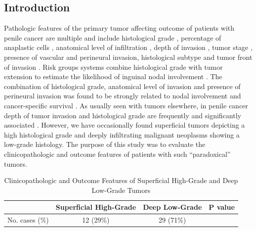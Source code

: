 \documentclass[11pt,letterpaper]{article}\usepackage[]{graphicx}\usepackage[]{color}
\begin{document}
\begin{multicols}{2}

\section*{Introduction}
Pathologic features of the primary tumor affecting outcome of patients with penile cancer are multiple and include histological grade \cite{Chaux2009,Chaux2009b,Velazquez2008}, percentage of anaplastic cells \cite{Slaton2001}, anatomical level of infiltration \cite{Chaux2009}, depth of invasion \cite{Dai2006,Emerson2001}, tumor stage \cite{Slaton2001,Dai2006,Guimaraes2006}, presence of vascular \cite{Slaton2001,Emerson2001,Guimaraes2006,Ficarra2005} and perineural \cite{Chaux2009,Velazquez2008} invasion, histological subtype \cite{Dai2006,Guimaraes2009} and tumor front of invasion \cite{Guimaraes2006}. Risk groups systems combine histological grade with tumor extension to estimate the likelihood of inguinal nodal involvement \cite{Solsona2001,Solsona2004,Hungerhuber2006,Ornellas2008}. The combination of histological grade, anatomical level of invasion and presence of perineural invasion was found to be strongly related to nodal involvement and cancer-specific survival \cite{Chaux2009}. As usually seen with tumors elsewhere, in penile cancer depth of tumor invasion and histological grade are frequently and significantly associated \cite{Guimaraes2009}. However, we have occasionally found superficial tumors depicting a high histological grade and deeply infiltrating malignant neoplasms showing a low-grade histology. The purpose of this study was to evaluate the clinicopathologic and outcome features of patients with such ``paradoxical'' tumors.

\begin{table}
\centering
\caption{Clinicopathologic and Outcome Features of Superficial High-Grade and Deep Low-Grade Tumors}
\label{Table_Distribution}
\begin{tabular}{lccl}
\hline
~ & \textbf{Superficial High-Grade} & \textbf{Deep Low-Grade} & \textbf{P value} \\
\hline
No. cases (\%)  & 12 (29\%)
                & 29 (71\%)
                & ~ \\


\end{tabular}
\end{table}
\end{multicols}
\end{document}
